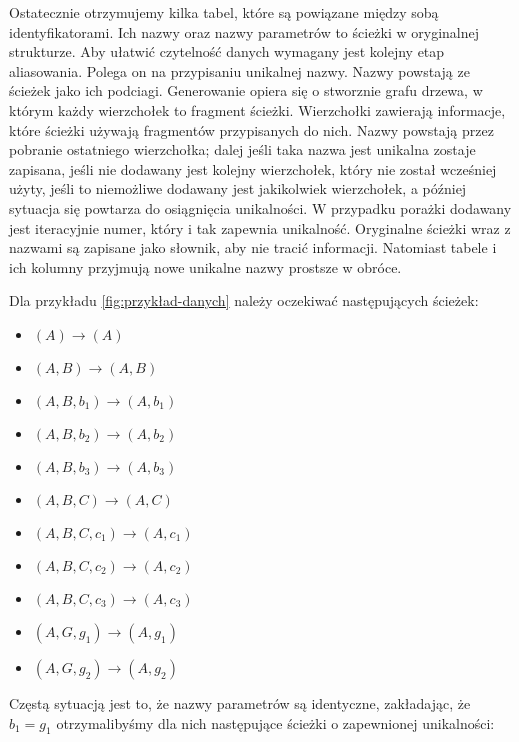 Ostatecznie otrzymujemy kilka tabel, które są powiązane między sobą identyfikatorami.
Ich nazwy oraz nazwy parametrów to ścieżki w oryginalnej strukturze. Aby ułatwić
czytelność danych wymagany jest kolejny etap aliasowania. Polega on na przypisaniu
unikalnej nazwy. Nazwy powstają ze ścieżek jako ich podciagi. Generowanie opiera się
o stworznie grafu drzewa, w którym każdy wierzchołek to fragment ścieżki. Wierzchołki
zawierają informacje, które ścieżki używają fragmentów przypisanych do nich.
Nazwy powstają przez pobranie ostatniego wierzchołka; dalej jeśli taka nazwa
jest unikalna zostaje zapisana, jeśli nie dodawany jest kolejny wierzchołek, który
nie został wcześniej użyty, jeśli to niemożliwe dodawany jest jakikolwiek wierzchołek,
a później sytuacja się powtarza do osiągnięcia unikalności. W przypadku porażki dodawany
jest iteracyjnie numer, który i tak zapewnia unikalność. Oryginalne ścieżki
wraz z nazwami są zapisane jako słownik, aby nie tracić informacji. Natomiast
tabele i ich kolumny przyjmują nowe unikalne nazwy prostsze w obróce.

Dla przykładu \ref{fig:przykład-danych} należy oczekiwać następujących ścieżek:

\begin{itemize}
\item $(A) \to (A)$
\item $(A, B) \to (A, B)$
\item $(A, B, b_1) \to (A, b_1)$
\item $(A, B, b_2) \to (A, b_2)$
\item $(A, B, b_3) \to (A, b_3)$
\item $(A, B, C) \to (A, C)$
\item $(A, B, C, c_1) \to (A, c_1)$
\item $(A, B, C, c_2) \to (A, c_2)$
\item $(A, B, C, c_3) \to (A, c_3)$
\item $(A, G, g_1) \to (A, g_1)$
\item $(A, G, g_2) \to (A, g_2)$
\end{itemize}

Częstą sytuacją jest to, że nazwy parametrów są identyczne,
zakładając, że $b_1 = g_1$ otrzymalibyśmy dla nich następujące
ścieżki o zapewnionej unikalności:

